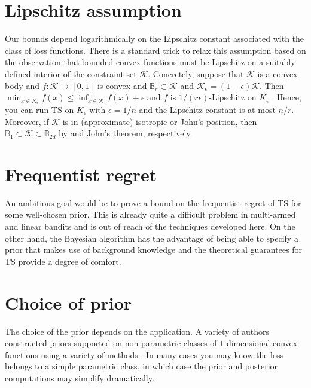 \documentclass[letter, 12pt]{report}
\newcommand{\ball}{\mathbb{B}}
\newcommand{\cK}{\mathcal K}
\newcommand{\1}{\mathbf{1}}
\newcommand{\ts}{\textsc{TS}\xspace}
\theoremstyle{plain}
\theoremstyle{definition}
\theoremstyle{remark}
\begin{document}
\section{Lipschitz assumption} Our bounds depend logarithmically on the Lipschitz constant associated with the class of loss functions.
There is a standard trick to relax this assumption based on the observation that bounded convex functions must be Lipschitz on a suitably defined
interior of the constraint set $\cK$.
Concretely, suppose that $\cK$ is a convex body and $f : \cK \to [0,1]$ is convex and $\ball_r \subset \cK$ and $\cK_\epsilon = (1 - \epsilon) \cK$.
Then $\min_{x \in K_\epsilon} f(x) \leq \inf_{x \in \cK} f(x) + \epsilon$ and $f$ is $1/(r\epsilon)$-Lipschitz on $K_\epsilon$ \citep[Chapter 3]{lat24book}.
Hence, you can run \ts{} on $K_\epsilon$ with $\epsilon = 1/n$ and the Lipschitz constant is at most $n/r$.
Moreover, if $\cK$ is in (approximate) isotropic or John's position, then $\ball_1 \subset \cK \subset \ball_{2d}$ by \cite{kannan1995isoperimetric}
and John's theorem, respectively.

\section{Frequentist regret}
An ambitious goal would be to prove a bound on the frequentist regret of \ts{} for some well-chosen prior.
This is already quite a difficult problem in multi-armed \citep{KKM12,AG12b} and linear bandits \citep{AG13} and is out of reach of the techniques developed here.
On the other hand, the Bayesian algorithm has the advantage of being able to specify a prior that makes use of background knowledge and the theoretical guarantees
for \ts{} provide a degree of comfort.

\section{Choice of prior} The choice of the prior depends on the application. A variety of authors constructed priors supported on non-parametric
classes of $1$-dimensional convex functions
using a variety of methods \citep{ramgopal1993nonparametric,chang2007shape,shively2011nonparametric}.
In many cases you may know the loss belongs to a simple parametric class, in which case the prior and posterior computations may simplify dramatically.
\end{document}
